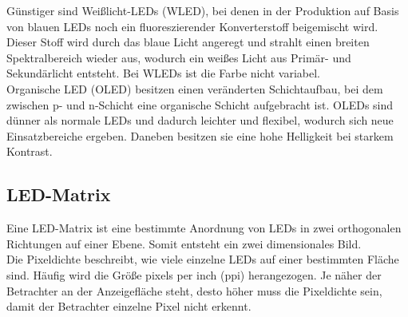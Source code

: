 Günstiger sind Weißlicht-LEDs (WLED), bei denen in der Produktion auf Basis von blauen LEDs noch ein fluoreszierender Konverterstoff beigemischt wird. Dieser Stoff wird durch das blaue Licht angeregt und strahlt einen breiten Spektralbereich wieder aus, wodurch ein weißes Licht aus Primär- und Sekundärlicht entsteht. Bei WLEDs ist die Farbe nicht variabel. \cite[Vgl. Seite 194]{LofflerMang.2020} \\
Organische LED (OLED) besitzen einen veränderten Schichtaufbau, bei dem zwischen p- und n-Schicht eine organische Schicht aufgebracht ist. OLEDs sind dünner als normale LEDs und dadurch leichter und flexibel, wodurch sich neue Einsatzbereiche ergeben. Daneben besitzen sie eine hohe Helligkeit bei starkem Kontrast. \cite[Vgl. Seite 195]{LofflerMang.2020}
\subsection{LED-Matrix}
Eine LED-Matrix ist eine bestimmte Anordnung von LEDs in zwei orthogonalen Richtungen auf einer Ebene. Somit entsteht ein zwei dimensionales Bild.\\ 
Die Pixeldichte beschreibt, wie viele einzelne LEDs auf einer bestimmten Fläche sind. Häufig wird die Größe \glqq pixels per inch\grqq{} (ppi) herangezogen. Je näher der Betrachter an der Anzeigefläche steht, desto höher muss die Pixeldichte sein, damit der Betrachter einzelne Pixel nicht erkennt.
